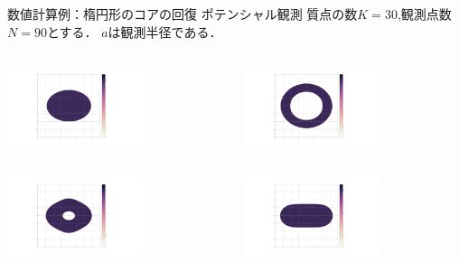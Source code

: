 \documentclass[dvipdfmx]{beamer}
\theoremstyle{remark}
\begin{document}
\begin{frame}{数値計算例：楕円形のコアの回復 ポテンシャル観測}
  質点の数$K=30$,観測点数$N=90$とする．
  $a$は観測半径である．
  \begin{columns}
    \begin{column}{0.38\columnwidth}
      \setcounter{figure}{5}
      \centering
      \includegraphics[width=4cm]{fig/elliptic.png}
    \end{column}
    \hspace{-1cm}
    \begin{column}{0.38\columnwidth}
      \setcounter{figure}{9}
      \centering
      \includegraphics[width=4cm]{fig/PR4N90K30E2.png}
    \end{column}
  \end{columns}

  \begin{columns}
    \begin{column}{0.38\columnwidth}
      \centering
      \includegraphics[width=4cm]{fig/PR10N90K30E2.png}
    \end{column}
    \hspace{-1cm}
    \begin{column}{0.38\columnwidth}
      \centering
      \includegraphics[width=4cm]{fig/PR30N90K30E2.png}
    \end{column}
  \end{columns}

\end{frame}
\end{document}
